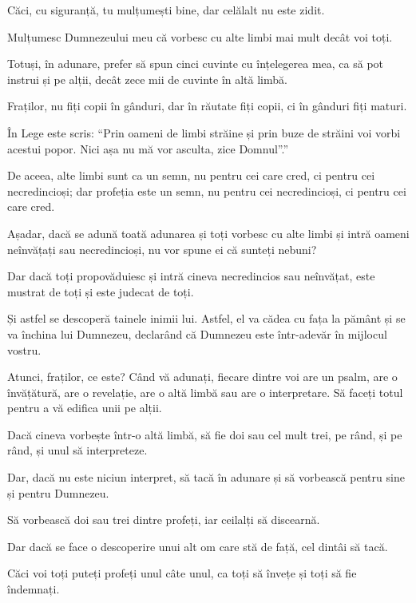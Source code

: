 {Căci, cu siguranță, tu mulțumești bine, dar celălalt nu este zidit.

Mulțumesc Dumnezeului meu că vorbesc cu alte limbi mai mult decât voi toți.

Totuși, în adunare, prefer să spun cinci cuvinte cu înțelegerea mea, ca să pot instrui și pe alții, decât zece mii de cuvinte în altă limbă.


\par }{\PP {}Fraților, nu fiți copii în gânduri, dar în răutate fiți copii, ci în gânduri fiți maturi.

În Lege este scris: “Prin oameni de limbi străine și prin buze de străini voi vorbi acestui popor. Nici așa nu mă vor asculta, zice Domnul”.”

De aceea, alte limbi sunt ca un semn, nu pentru cei care cred, ci pentru cei necredincioși; dar profeția este un semn, nu pentru cei necredincioși, ci pentru cei care cred.

Așadar, dacă se adună toată adunarea și toți vorbesc cu alte limbi și intră oameni neînvățați sau necredincioși, nu vor spune ei că sunteți nebuni?

Dar dacă toți propovăduiesc și intră cineva necredincios sau neînvățat, este mustrat de toți și este judecat de toți.

Și astfel se descoperă tainele inimii lui. Astfel, el va cădea cu fața la pământ și se va închina lui Dumnezeu, declarând că Dumnezeu este într-adevăr în mijlocul vostru.


\par }{\PP {}Atunci, fraților, ce este? Când vă adunați, fiecare dintre voi are un psalm, are o învățătură, are o revelație, are o altă limbă sau are o interpretare. Să faceți totul pentru a vă edifica unii pe alții.

Dacă cineva vorbește într-o altă limbă, să fie doi sau cel mult trei, pe rând, și pe rând, și unul să interpreteze.

Dar, dacă nu este niciun interpret, să tacă în adunare și să vorbească pentru sine și pentru Dumnezeu.

Să vorbească doi sau trei dintre profeți, iar ceilalți să discearnă.

Dar dacă se face o descoperire unui alt om care stă de față, cel dintâi să tacă.

Căci voi toți puteți profeți unul câte unul, ca toți să învețe și toți să fie îndemnați.

}
